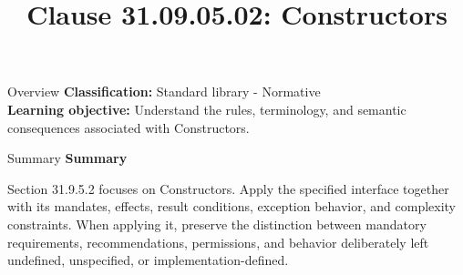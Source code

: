 \documentclass[10pt,letterpaper]{article}
\title{Clause 31.09.05.02: Constructors}
\author{}
\date{}
\begin{document}
\maketitle
\begin{CornellOverviewBox}{Overview}
\textbf{Classification:} Standard library - Normative\\[2pt]
\textbf{Learning objective:} Understand the rules, terminology, and semantic consequences associated with Constructors.
\end{CornellOverviewBox}\begin{CornellSummaryBox}{Summary}
{\sffamily\bfseries\color{Accent} Summary}\par\vspace{3pt}Section 31.9.5.2 focuses on Constructors. Apply the specified interface together with its mandates, effects, result conditions, exception behavior, and complexity constraints. When applying it, preserve the distinction between mandatory requirements, recommendations, permissions, and behavior deliberately left undefined, unspecified, or implementation-defined.
\end{CornellSummaryBox}
\end{document}
